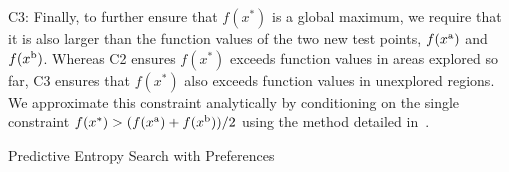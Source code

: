 C3: Finally, to further ensure that $f(x^*)$ is a global maximum, we require
that it is also larger than the function values of the two new test points,
$f(x^{\mathrm{a}})$ and $f(x^{\mathrm{b}})$. Whereas C2 ensures $f(x^*)$ exceeds function
values in areas explored so far, C3 ensures that $f(x^*)$ also exceeds function
values in unexplored regions. We approximate this constraint analytically by
conditioning on the single constraint $f(x^*) > (f(x^{\mathrm{a}}) + f(x^{\mathrm{b}}))/2$
using the
method detailed in~\citep{xu2010estimation}.
\begin{algorithm}[t]
    \caption{Predictive Entropy Search with Preferences}
    \begin{algorithmic}[1]
            \EndFor{}
        \EndProcedure{}
        \Statex{}
        \EndFunction{}
    \end{algorithmic}\label{alg:pesp}
\end{algorithm}

